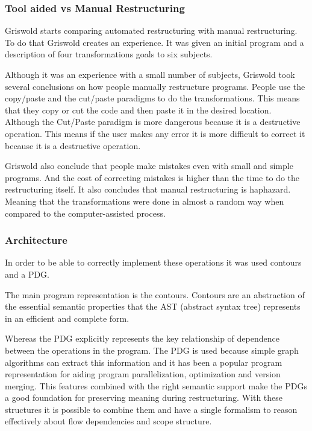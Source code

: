 \subsubsection{Tool aided vs Manual Restructuring}
Griswold starts comparing automated restructuring with manual restructuring. 
To do that Griswold creates an experience.
It was given an initial program and a description of four transformations goals to six subjects.%

Although it was an experience with a small number of subjects, Griswold took several conclusions on how people manually restructure programs.
People use the copy/paste and the cut/paste paradigms to do the transformations. 
This means that they copy or cut the code and then paste it in the desired location.
Although the Cut/Paste paradigm is more dangerous because it is a destructive operation. 
This means if the user makes any error it is more difficult to correct it because it is a destructive operation.

Griswold also conclude that people make mistakes even with small and simple programs. 
And the cost of correcting mistakes is higher than the time to do the restructuring itself. 
It also concludes that manual restructuring is haphazard. 
Meaning that the transformations were done in almost a random way when compared to the computer-assisted process.


\subsubsection{Architecture}

In order to be able to correctly implement these operations it was used contours and a PDG.

The main program representation is the contours. 
Contours are an abstraction of the essential semantic properties that the AST (abstract syntax tree) represents in an efficient and complete form.

Whereas the PDG explicitly represents the key relationship of dependence between the operations in the program. 
The PDG is used because simple graph algorithms can extract this information and it has been a popular program representation for aiding program parallelization, optimization and version merging.
This features combined with the right semantic support make the PDGs a good foundation for preserving meaning during restructuring.
With these structures it is possible to combine them and have a single formalism to reason effectively about flow dependencies and scope structure.

